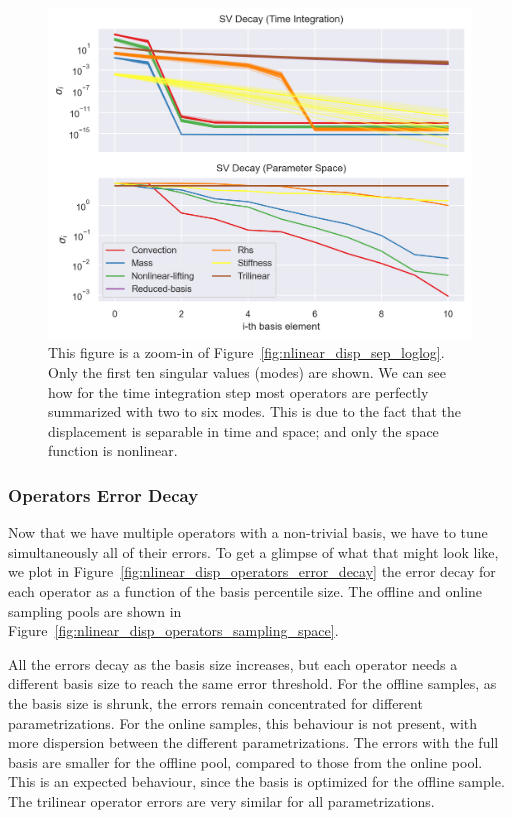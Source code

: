 \documentclass[../../thesis.tex]{subfiles}
\begin{document}
\begin{figure}[h]
    \includegraphics[width =\columnwidth]{research_project/piston/figures/nonlinear_displacement/separable/sigmas_logy.png}
    \caption{This figure is a zoom-in of Figure~\ref{fig:nlinear_disp_sep_loglog}.
    Only the first ten singular values (modes) are shown.
    We can see how for the time integration step most operators 
    are perfectly summarized with two to six modes.
    This is due to the fact that the displacement is separable in time and space;
    and only the space function is nonlinear.}
    \label{fig:nlinear_disp_sep_logy}
\end{figure}

\subsubsection{Operators Error Decay}
Now that we have multiple operators with a non-trivial basis, 
we have to tune simultaneously all of their errors.
To get a glimpse of what that might look like, 
we plot in Figure~\ref{fig:nlinear_disp_operators_error_decay}
the error decay for each operator as a function of the basis percentile size.
The offline and online sampling pools are shown in 
Figure~\ref{fig:nlinear_disp_operators_sampling_space}.

All the errors decay as the basis size increases, 
but each operator needs a different basis size to reach the same error threshold.
For the offline samples, as the basis size is shrunk, 
the errors remain concentrated for different parametrizations.
For the online samples, this behaviour is not present, 
with more dispersion between the different parametrizations.
The errors with the full basis are smaller for the offline pool, 
compared to those from the online pool.
This is an expected behaviour, 
since the basis is optimized for the offline sample.
The trilinear operator errors are very similar for all parametrizations.
\end{document}
